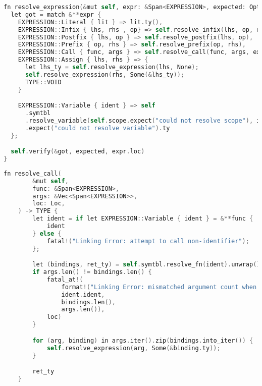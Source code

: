 \begin{lstlisting}[language=C]
fn resolve_expression(&mut self, expr: &Span<EXPRESSION>, expected: Option<&TYPE>) -> TYPE {
  let got = match &**expr {
    EXPRESSION::Literal { lit } => lit.ty(),
    EXPRESSION::Infix { lhs, rhs , op} => self.resolve_infix(lhs, op, rhs),
    EXPRESSION::Postfix { lhs, op } => self.resolve_postfix(lhs, op),
    EXPRESSION::Prefix { op, rhs } => self.resolve_prefix(op, rhs),
    EXPRESSION::Call { func, args } => self.resolve_call(func, args, expr.loc),
    EXPRESSION::Assign { lhs, rhs } => {
      let lhs_ty = self.resolve_expression(lhs, None);
      self.resolve_expression(rhs, Some(&lhs_ty));
      TYPE::VOID
    }

    EXPRESSION::Variable { ident } => self
      .symtbl
      .resolve_variable(self.scope.expect("could not resolve scope"), ident)
      .expect("could not resolve variable").ty
  };

  self.verify(&got, expected, expr.loc)
}
\end{lstlisting}

\begin{lstlisting}[language=C]
    fn resolve_call(
        &mut self,
        func: &Span<EXPRESSION>,
        args: &Vec<Span<EXPRESSION>>,
        loc: Loc,
    ) -> TYPE {
        let ident = if let EXPRESSION::Variable { ident } = &**func {
            ident
        } else {
            fatal!("Linking Error: attempt to call non-identifier");
        };

        let (bindings, ret_ty) = self.symtbl.resolve_fn(ident).unwrap();
        if args.len() != bindings.len() {
            fatal_at!(
                format!("Linking Error: mismatched argument count when calling '{}', expected: {}, got: {}", 
                ident.ident, 
                bindings.len(), 
                args.len()), 
            loc)
        }

        for (arg, binding) in args.iter().zip(bindings.into_iter()) {
            self.resolve_expression(arg, Some(&binding.ty));
        }

        ret_ty
    }
\end{lstlisting}

